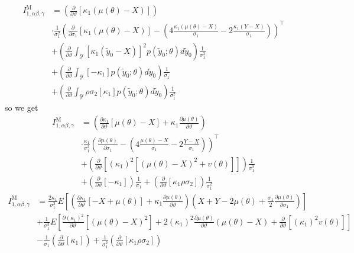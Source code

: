 \documentclass[11pt]{article}%
\theoremstyle{definition}
\begin{document}
\begin{align}
I_{1,\alpha\beta,\gamma}^{\text{M}} &  =\left(  \frac{\partial}{\partial
\vartheta}\left[  \kappa{_{1}(\mu(\theta)-X)}\right]  \right)  \\
&  \cdot\frac{1}{\sigma_{1}^{2}}\left(  \frac{\partial}{\partial\sigma_{1}%
}\left[  \kappa{_{1}(\mu(\theta)-X)}\right]  -\left(  4\frac{\kappa{_{1}%
(\mu(\theta)-X)}}{\sigma_{1}}-2\frac{\kappa{_{1}(Y-X)}}{\sigma_{1}}\right)
\right)  ^{\intercal}\nonumber\\
&  +\left(  \frac{\partial}{\partial\vartheta}\int_{\mathcal{Y}}[\kappa
{_{1}(\tilde{y}_{0}-X)}]^{2}p(\tilde{y}_{0};\theta)d\tilde{y}_{0}\right)
\frac{1}{\sigma_{1}^{3}}\nonumber\\
&  +\left(  \frac{\partial}{\partial\vartheta}\int_{\mathcal{Y}}[-\kappa
_{1}]p(\tilde{y}_{0};\theta)d\tilde{y}_{0}\right)  \frac{1}{\sigma_{1}}\\
&  +\left(  \frac{\partial}{\partial\vartheta}\int_{\mathcal{Y}}\rho\sigma
_{2}[\kappa_{1}]p(\tilde{y}_{0};\theta)d\tilde{y}_{0}\right)  \frac{1}%
{\sigma_{1}^{2}}\nonumber
\end{align}
so we get%
\begin{align}
I_{1,\alpha\beta,\gamma}^{\text{M}} &  =\left(  \frac{\partial\kappa{_{1}}%
}{\partial\vartheta}\left[  {\mu(\theta)-X}\right]  +\kappa{_{1}}%
\frac{\partial{\mu(\theta)}}{\partial\vartheta}\right)  \\
&  \cdot\frac{\kappa{_{1}}}{\sigma_{1}^{2}}\left(  \frac{\partial{\mu(\theta
)}}{\partial\sigma_{1}}-\left(  4\frac{{\mu(\theta)-X}}{\sigma_{1}}%
-2\frac{{Y-X}}{\sigma_{1}}\right)  \right)  ^{\intercal}\nonumber\\
&  +\left(  \frac{\partial}{\partial\vartheta}\left[  (\kappa_{1})^{2}\left[
{(\mu(\theta)-X)}^{2}+v{(\theta)}\right]  \right]  \right)  \frac{1}%
{\sigma_{1}^{3}}\nonumber\\
&  +\left(  \frac{\partial}{\partial\vartheta}[-\kappa_{1}]\right)  \frac
{1}{\sigma_{1}}+\left(  \frac{\partial}{\partial\vartheta}\left[  \kappa
_{1}\rho\sigma_{2}\right]  \right)  \frac{1}{\sigma_{1}^{2}}%
\end{align}%
\begin{align*}
I_{1,\alpha\beta,\gamma}^{\text{M}}  & =\frac{2\kappa{_{1}}}{\sigma_{1}^{3}%
}E\left[  \left(  \frac{\partial\kappa{_{1}}}{\partial\vartheta}\left[
{-X+\mu(\theta)}\right]  +\kappa{_{1}}\frac{\partial{\mu(\theta)}}%
{\partial\vartheta}\right)  \left(  X+Y-2{\mu(\theta)}+\frac{\sigma_{1}}%
{2}\frac{\partial{\mu(\theta)}}{\partial\sigma_{1}}\right)  \right]  \\
& +\frac{1}{\sigma_{1}^{3}}E\left[  \frac{\partial(\kappa_{1})^{2}}%
{\partial\vartheta}\left[  {(\mu(\theta)-X)}^{2}\right]  +2(\kappa_{1}%
)^{2}\frac{\partial{\mu(\theta)}}{\partial\vartheta}{(\mu(\theta)-X)}%
+\frac{\partial}{\partial\vartheta}\left[  (\kappa_{1})^{2}v{(\theta)}\right]
\right]  \\
& -\frac{1}{\sigma_{1}}\left(  \frac{\partial}{\partial\vartheta}[\kappa
_{1}]\right)  +\frac{1}{\sigma_{1}^{2}}\left(  \frac{\partial}{\partial
\vartheta}\left[  \kappa_{1}\rho\sigma_{2}\right]  \right)
\end{align*}
\end{document}
